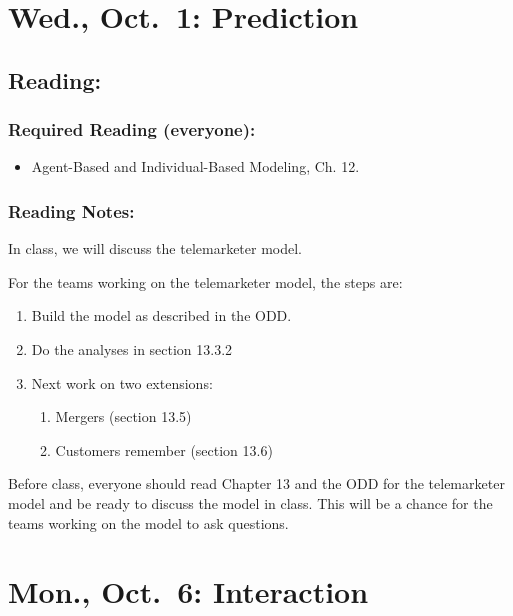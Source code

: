 \documentclass[
]{article}
\providecommand{\tightlist}{%
  \setlength{\itemsep}{0pt}\setlength{\parskip}{0pt}}
\begin{document}
\section{Wed., Oct.~1: Prediction}\label{wed.-oct.-1-prediction}

\subsection{Reading:}\label{reading-12}

\subsubsection{Required Reading
(everyone):}\label{required-reading-everyone-11}

\begin{itemize}
\tightlist
\item
  Agent-Based and Individual-Based Modeling, Ch. 12.
\end{itemize}

\subsubsection{Reading Notes:}\label{reading-notes-11}

In class, we will discuss the telemarketer model.

For the teams working on the telemarketer model, the steps are:

\begin{enumerate}
\def\labelenumi{\arabic{enumi}.}
\tightlist
\item
  Build the model as described in the ODD.
\item
  Do the analyses in section 13.3.2
\item
  Next work on two extensions:

  \begin{enumerate}
  \def\labelenumii{\arabic{enumii}.}
  \tightlist
  \item
    Mergers (section 13.5)
  \item
    Customers remember (section 13.6)
  \end{enumerate}
\end{enumerate}

Before class, everyone should read Chapter 13 and the ODD for the
telemarketer model and be ready to discuss the model in class. This will
be a chance for the teams working on the model to ask questions.

\section{Mon., Oct.~6: Interaction}\label{mon.-oct.-6-interaction}
\end{document}

